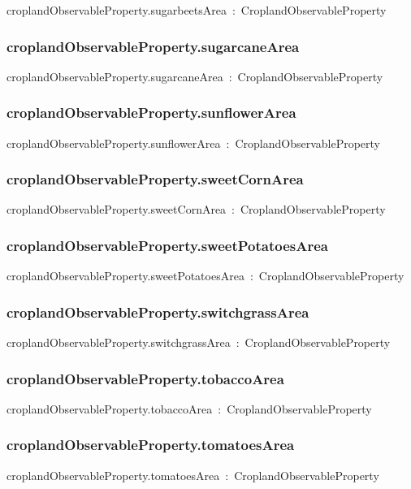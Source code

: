\documentclass{article}
\begin{document}
croplandObservableProperty.sugarbeetsArea~:~CroplandObservableProperty

\subsubsection*{croplandObservableProperty.sugarcaneArea}

croplandObservableProperty.sugarcaneArea~:~CroplandObservableProperty

\subsubsection*{croplandObservableProperty.sunflowerArea}

croplandObservableProperty.sunflowerArea~:~CroplandObservableProperty

\subsubsection*{croplandObservableProperty.sweetCornArea}

croplandObservableProperty.sweetCornArea~:~CroplandObservableProperty

\subsubsection*{croplandObservableProperty.sweetPotatoesArea}

croplandObservableProperty.sweetPotatoesArea~:~CroplandObservableProperty

\subsubsection*{croplandObservableProperty.switchgrassArea}

croplandObservableProperty.switchgrassArea~:~CroplandObservableProperty

\subsubsection*{croplandObservableProperty.tobaccoArea}

croplandObservableProperty.tobaccoArea~:~CroplandObservableProperty

\subsubsection*{croplandObservableProperty.tomatoesArea}

croplandObservableProperty.tomatoesArea~:~CroplandObservableProperty
\end{document}
